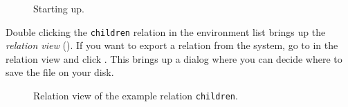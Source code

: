 \documentclass[a4,14pt,latin1]{article}
\begin{document}
\begin{figure}[bp]
  \centering
  \caption{Starting up.}
  \label{fig:startup}
\end{figure}


Double clicking the {\tt children} relation in the environment list
brings up the {\it relation view} (). If
you want to export a relation from the \RAS{} system, go to
 in the relation view and click . This
brings up a dialog where you can decide where to save the file on your
disk.

\begin{figure}
  \centering
  \caption{Relation view of the example relation {\tt children}.}
  \label{fig:child_relation}
\end{figure}
\end{document}
